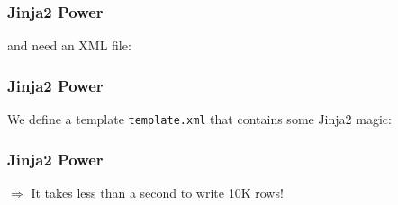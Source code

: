 \documentclass[ngerman]{beamer}
\begin{document}
\begin{frame}[fragile]
\frametitle{Jinja2 Power}

and need an XML file:\vspace*{1em}



\end{frame}

\begin{frame}[fragile]
\frametitle{Jinja2 Power}

We define a template \texttt{template.xml} that contains some Jinja2 magic:



\end{frame}

\begin{frame}[fragile]
\frametitle{Jinja2 Power}



$\Rightarrow$ It takes less than a second to write 10K rows!

\end{frame}
\end{document}
